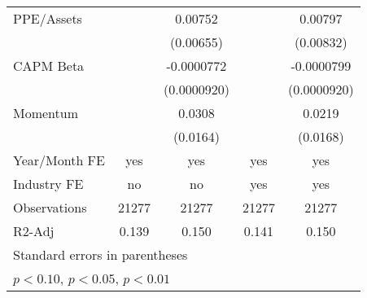 {\begin{tabular}{l*{4}{c}}
PPE/Assets          &                     &     0.00752         &                     &     0.00797         \\
                    &                     &   (0.00655)         &                     &   (0.00832)         \\
CAPM Beta           &                     &  -0.0000772         &                     &  -0.0000799         \\
                    &                     & (0.0000920)         &                     & (0.0000920)         \\
Momentum            &                     &      0.0308\sym{*}  &                     &      0.0219         \\
                    &                     &    (0.0164)         &                     &    (0.0168)         \\
\hline
Year/Month FE       &         yes         &         yes         &         yes         &         yes         \\
Industry FE         &          no         &          no         &         yes         &         yes         \\
Observations        &       21277         &       21277         &       21277         &       21277         \\
R2-Adj              &       0.139         &       0.150         &       0.141         &       0.150         \\
\hline\hline
\multicolumn{5}{l}{\footnotesize Standard errors in parentheses}\\
\multicolumn{5}{l}{\footnotesize \sym{*} \(p<0.10\), \sym{**} \(p<0.05\), \sym{***} \(p<0.01\)}\\
\end{tabular}
}
